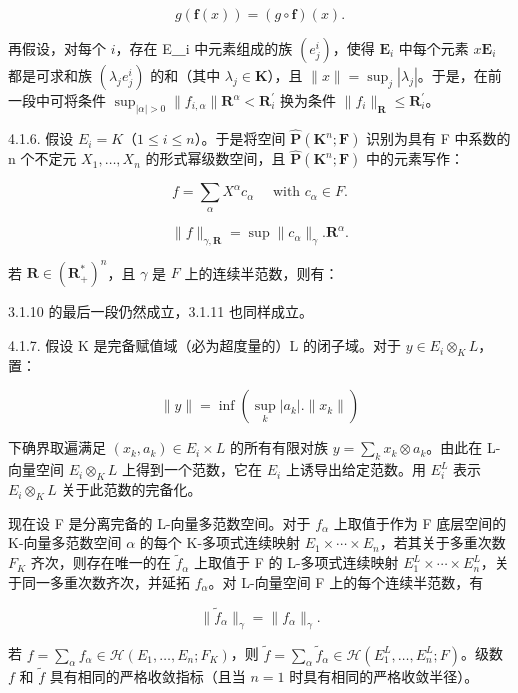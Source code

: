 \[
g (\mathbf {f} (x)) = (g \circ \mathbf {f}) (x).
\]

再假设，对每个 \(i\)，存在 E＿i 中元素组成的族 \((e_{j}^{i})\)，使得 \(\mathbf{E}_{i}\) 中每个元素 \(x\)\(\mathbf{E}_{i}\) 都是可求和族 \((\lambda_{j}e_{j}^{i})\) 的和（其中 \(\lambda_{j}\in\mathbf{K}\)），且 \(\|x\|=\sup_{j}|\lambda_{j}|\)。于是，在前一段中可将条件 \(\sup_{|\alpha|>0}\|f_{i,\alpha}\|\mathbf{R}^{\alpha}<\mathbf{R}_{i}^{\prime}\) 换为条件 \(\|f_{i}\|_{\mathbf{R}}\leqslant\mathbf{R}_{i}^{\prime}\)。

4.1.6. 假设 \(E_{i} = K\)（\(1 \leqslant i \leqslant n\)）。于是将空间 \(\hat{\mathbf{P}}(\mathbf{K}^{n}; \mathbf{F})\) 识别为具有 F 中系数的 n 个不定元 \(X_{1}, \ldots, X_{n}\) 的形式幂级数空间，且 \(\hat{\mathbf{P}}(\mathbf{K}^{n}; \mathbf{F})\) 中的元素写作：

\[
f = \sum_ {\alpha} X ^ {\alpha} c _ {\alpha} \quad \text { with } c _ {\alpha} \in F.
\]

\[
\| f \| _ {\gamma , \mathbf {R}} = \sup \| c _ {\alpha} \| _ {\gamma}. \mathbf {R} ^ {\alpha}.
\]

若 \(\mathbf{R} \in (\mathbf{R}_{+}^{*})^{n}\)，且 \(\gamma\) 是 \(F\) 上的连续半范数，则有：

3.1.10 的最后一段仍然成立，3.1.11 也同样成立。

4.1.7. 假设 K 是完备赋值域（必为超度量的）L 的闭子域。对于 \(y \in E_{i} \otimes_{K} L\)，置：

\[
\| y \| = \inf (\sup _ {k} | a _ {k} |. \| x _ {k} \|)
\]

下确界取遍满足 \((x_{k}, a_{k}) \in E_{i} \times L\) 的所有有限对族 \(y = \sum_{k} x_{k} \otimes a_{k}\)。由此在 L-向量空间 \(E_{i} \otimes_{K} L\) 上得到一个范数，它在 \(E_{i}\) 上诱导出给定范数。用 \(E_{i}^{L}\) 表示 \(E_{i} \otimes_{K} L\) 关于此范数的完备化。

现在设 F 是分离完备的 L-向量多范数空间。对于 \(f_{\alpha}\) 上取值于作为 F 底层空间的 K-向量多范数空间 \(\alpha\) 的每个 K-多项式连续映射 \(E_1 \times \cdots \times E_n\)，若其关于多重次数 \(F_K\) 齐次，则存在唯一的在 \(\tilde{f}_{\alpha}\) 上取值于 F 的 L-多项式连续映射 \(E_1^L \times \cdots \times E_n^L\)，关于同一多重次数齐次，并延拓 \(f_{\alpha}\)。对 L-向量空间 F 上的每个连续半范数，有

\[
\| \tilde {f} _ {\alpha} \| _ {\gamma} = \| f _ {\alpha} \| _ {\gamma}.
\]

若 \(f = \sum_{\alpha} f_{\alpha} \in \mathcal{H}(E_1, \ldots, E_n; F_K)\)，则 \(\tilde{f} = \sum_{\alpha} \tilde{f}_{\alpha} \in \mathcal{H}(E_1^L, \ldots, E_n^L; F)\)。级数 \(f\) 和 \(\tilde{f}\) 具有相同的严格收敛指标（且当 \(n = 1\) 时具有相同的严格收敛半径）。

